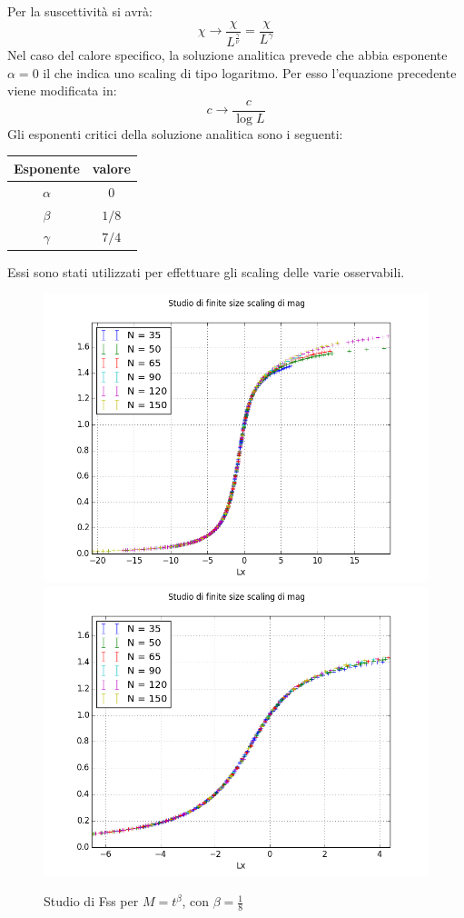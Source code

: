 Per la suscettività si avrà:
$$
	\chi \longrightarrow \frac{\chi}{L^{\frac{\gamma}{\nu}}} = \frac{\chi}{L^{\gamma}}
$$
Nel caso del calore specifico, la soluzione analitica prevede che abbia esponente $\alpha=0$ il che indica uno scaling di tipo logaritmo. Per esso l'equazione precedente viene modificata in:
$$
	c \longrightarrow \frac{c}{\log{L}}
$$
Gli esponenti critici della soluzione analitica sono i seguenti:\\
\begin{center}
	\begin{tabular}{c c }
		\toprule
		Esponente & valore \\
		\midrule
		$\alpha$ & 0 \\
		$\beta$ & $1/8$\\
		$\gamma$ & $7/4$ \\
		\bottomrule
	\end{tabular}
\end{center}
Essi sono stati utilizzati per effettuare gli scaling delle varie osservabili.
\begin{center}
	\begin{figure}[h]
		\centering
		\includegraphics[scale=0.6]{sw/fssmag.png}
		\includegraphics[scale=0.6]{sw/fssmagzoom.png}
		\caption{Studio di Fss per $M= t^{\beta}$, con $\beta=\frac{1}{8}$}
	\end{figure}
\end{center}
